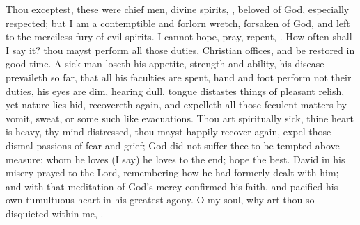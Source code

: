 {Thou exceptest, these were chief men, divine spirits, , beloved
of God, especially respected; but I am a contemptible and forlorn
wretch, forsaken of God, and left to the merciless fury of evil
spirits. I cannot hope, pray, repent, \etc{}. How often shall I say it?
thou mayst perform all those duties, Christian offices, and be restored
in good time. A sick man loseth his appetite, strength and ability, his
disease prevaileth so far, that all his faculties are spent, hand and
foot perform not their duties, his eyes are dim, hearing dull, tongue
distastes things of pleasant relish, yet nature lies hid, recovereth
again, and expelleth all those feculent matters by vomit, sweat, or
some such like evacuations. Thou art spiritually sick, thine heart is
heavy, thy mind distressed, thou mayst happily recover again, expel
those dismal passions of fear and grief; God did not suffer thee to be
tempted above measure; whom he loves (I say) he loves to the end; hope
the best. David in his misery prayed to the Lord, remembering how he
had formerly dealt with him; and with that meditation of God's mercy
confirmed his faith, and pacified his own tumultuous heart in his
greatest agony. O my soul, why art thou so disquieted within me, \etc{}.

}
